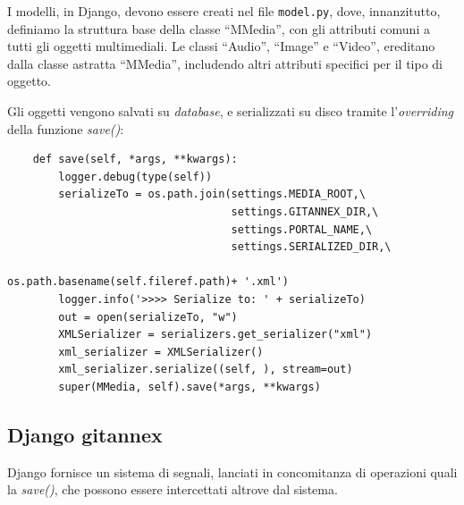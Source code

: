 I modelli, in Django, devono essere creati nel file \verb|model.py|,
dove, innanzitutto, definiamo la struttura base della classe
``MMedia'', con gli attributi comuni a tutti gli oggetti
multimediali. Le classi ``Audio'', ``Image'' e ``Video'', ereditano
dalla classe astratta ``MMedia'', includendo altri attributi specifici
per il tipo di oggetto.

Gli oggetti vengono salvati su \emph{database}, e serializzati su
disco tramite l'\emph{overriding} della funzione \emph{save()}:

\lstset{language=Python}
\begin{lstlisting}
    def save(self, *args, **kwargs):
        logger.debug(type(self))
        serializeTo = os.path.join(settings.MEDIA_ROOT,\
                                   settings.GITANNEX_DIR,\
                                   settings.PORTAL_NAME,\
                                   settings.SERIALIZED_DIR,\
                                   os.path.basename(self.fileref.path)+ '.xml')
        logger.info('>>>> Serialize to: ' + serializeTo)
        out = open(serializeTo, "w")
        XMLSerializer = serializers.get_serializer("xml")
        xml_serializer = XMLSerializer()
        xml_serializer.serialize((self, ), stream=out)
        super(MMedia, self).save(*args, **kwargs)
\end{lstlisting}

\subsection{Django gitannex}

Django fornisce un sistema di segnali, lanciati in concomitanza di
operazioni quali la \emph{save()}, che possono essere intercettati
altrove dal sistema.  




